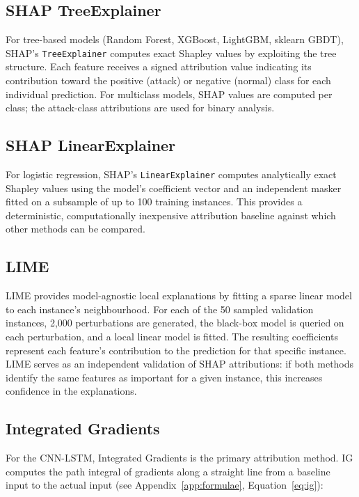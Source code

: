 \documentclass[12pt,a4paper]{report}
\begin{document}
\subsection{SHAP TreeExplainer}
\label{sec:shap-tree-meth}

For tree-based models (Random Forest, XGBoost, LightGBM, sklearn GBDT), SHAP's \texttt{TreeExplainer} \citep{lundberg2020} computes exact Shapley values by exploiting the tree structure. Each feature receives a signed attribution value indicating its contribution toward the positive (attack) or negative (normal) class for each individual prediction. For multiclass models, SHAP values are computed per class; the attack-class attributions are used for binary analysis.

\subsection{SHAP LinearExplainer}
\label{sec:shap-linear-meth}

For logistic regression, SHAP's \texttt{LinearExplainer} computes analytically exact Shapley values using the model's coefficient vector and an independent masker fitted on a subsample of up to 100 training instances. This provides a deterministic, computationally inexpensive attribution baseline against which other methods can be compared.

\subsection{LIME}
\label{sec:lime-meth}

LIME \citep{ribeiro2016} provides model-agnostic local explanations by fitting a sparse linear model to each instance's neighbourhood. For each of the 50 sampled validation instances, 2,000 perturbations are generated, the black-box model is queried on each perturbation, and a local linear model is fitted. The resulting coefficients represent each feature's contribution to the prediction for that specific instance. LIME serves as an independent validation of SHAP attributions: if both methods identify the same features as important for a given instance, this increases confidence in the explanations.

\subsection{Integrated Gradients}
\label{sec:ig-meth}

For the CNN-LSTM, Integrated Gradients \citep{sundararajan2017} is the primary attribution method. IG computes the path integral of gradients along a straight line from a baseline input to the actual input (see Appendix~\ref{app:formulae}, Equation~\ref{eq:ig}):
\end{document}
